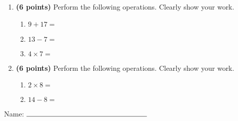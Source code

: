\documentclass[12pt]{amsart}
\begin{document}
\newpage
\begin{enumerate}
\item {\bf (6 points)} 
 Perform the following operations. Clearly show your work. \begin{enumerate}


\def \a{9}\def \b{17}\def \apb{26}

 
\item $\a + \b = $

\vspace{2cm}
\def \a{13}\def \dif{6}\def \b{7}

 
\item $\a - \b = $

\vspace{2cm}
\def \a{4}\def \b{7}\def \ab{11}

 
\item $\a \times \b = $ 

\vspace{2cm}
\def \vshift{-5}\def \hshift{-4}\def \chang{-2}\def \findval{-6}\def \yval{-1}

 
\end{enumerate}


\newpage
\item {\bf (6 points)} 
 Perform the following operations. Clearly show your work. \begin{enumerate}


\def \a{2}\def \b{8}\def \ab{10}

 
\item $\a \times \b = $ 

\vspace{2cm}
\def \a{14}\def \dif{6}\def \b{8}

 
\item $\a - \b = $

\vspace{2cm}
\def \vshift{-3}\def \hshift{4}\def \chang{1}\def \findval{5}\def \yval{-5}

 
\end{enumerate}


\newpage\end{enumerate}\graphicspath{{/Users/jilan/Downloads/Randomizer/Randomizer/Sample Course/Sample Assessment 2/}}\setcounter{page}{1}


\thispagestyle{fancy}

 
\noindent Name: $\rule{6cm}{0.15mm}$

\vspace{.2cm}
\end{document}
